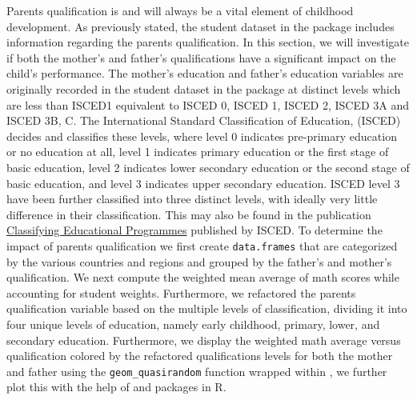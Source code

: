 Parents qualification is and will always be a vital element of childhood
development. As previously stated, the student dataset in the package
includes information regarding the parents qualification. In this
section, we will investigate if both the mother's and father's
qualifications have a significant impact on the child's performance. The
mother's education and father's education variables are originally
recorded in the student dataset in the  package
at distinct levels which are less than ISCED1 equivalent to ISCED 0,
ISCED 1, ISCED 2, ISCED 3A and ISCED 3B, C. The International Standard
Classification of Education, (ISCED) decides and classifies these
levels, where level 0 indicates pre-primary education or no education at
all, level 1 indicates primary education or the first stage of basic
education, level 2 indicates lower secondary education or the second
stage of basic education, and level 3 indicates upper secondary
education. ISCED level 3 have been further classified into three
distinct levels, with ideally very little difference in their
classification. This may also be found in the publication
\href{https://www.oecd.org/education/1841854.pdf}{Classifying
Educational Programmes} \citep{isced} published by ISCED. To determine
the impact of parents qualification we first create \texttt{data.frames}
that are categorized by the various countries and regions and grouped by
the father's and mother's qualification. We next compute the weighted
mean average of math scores while accounting for student weights.
Furthermore, we refactored the parents qualification variable based on
the multiple levels of classification, dividing it into four unique
levels of education, namely early childhood, primary, lower, and
secondary education. Furthermore, we display the weighted math average
versus qualification colored by the refactored qualifications levels for
both the mother and father using the \texttt{geom\_quasirandom} function
wrapped within  \citep{ggplot2}, we further plot this
with the help of  \citep{viridis} and
 \citep{patchwork} packages in R.

